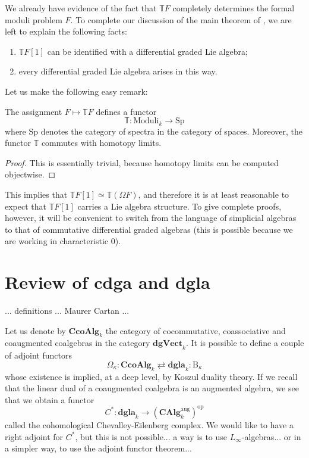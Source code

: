 \begin{refsection}
We already have evidence of the fact that $\mathbb T F$ completely determines the formal moduli problem $F$. To complete our discussion of the main theorem of \cite{dagx}, we are left to explain the following facts:
\begin{enumerate}
\item $\mathbb T F[1]$ can be identified with a differential graded Lie algebra;
\item every differential graded Lie algebra arises in this way.
\end{enumerate}

Let us make the following easy remark:

\begin{lemma}
The assignment $F \mapsto \mathbb T F$ defines a functor
\[
\mathbb T \colon \mathrm{Moduli}_k \to \mathrm{Sp}
\]
where $\mathrm{Sp}$ denotes the category of spectra in the category of spaces. Moreover, the functor $\mathbb T$ commutes with homotopy limits.
\end{lemma}

\begin{proof}
This is essentially trivial, because homotopy limits can be computed objectwise.
\end{proof}

This implies that $\mathbb T F[1] \simeq \mathbb T(\Omega F)$, and therefore it is at least reasonable to expect that $\mathbb T F[1]$ carries a Lie algebra structure. To give complete proofs, however, it will be convenient to switch from the language of simplicial algebras to that of commutative differential graded algebras (this is possible because we are working in characteristic $0$).

\section{Review of cdga and dgla}

... definitions ... Maurer Cartan ...

Let us denote by $\mathbf{CcoAlg}_k$ the category of cocommutative, coassociative and coaugmented coalgebras in the category $\mathbf{dgVect}_k$. It is possible to define a couple of adjoint functors
\[
\Omega_\kappa \colon \mathbf{CcoAlg}_k \rightleftarrows \mathbf{dgla}_k \colon \mathrm{B}_\kappa
\]
whose existence is implied, at a deep level, by Koszul duality theory. If we recall that the linear dual of a coaugmented coalgebra is an augmented algebra, we see that we obtain a functor
\[
C^* \colon \mathbf{dgla}_k \to (\mathbf{CAlg}_k^{\mathrm{aug}})^{\mathrm{op}}
\]
called the cohomological Chevalley-Eilenberg complex. We would like to have a right adjoint for $C^*$, but this is not possible... a way is to use $L_\infty$-algebras... or in a simpler way, to use the adjoint functor theorem...


\end{refsection}
